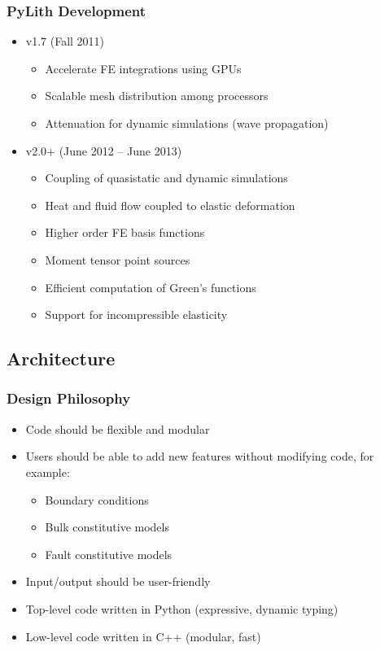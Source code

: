 \documentclass{beamer}
\begin{document}
\begin{frame}
  \frametitle{PyLith Development}

  \begin{itemize}
 \item v1.7 (Fall 2011)
    \begin{itemize}
    \item Accelerate FE integrations using GPUs
    \item Scalable mesh distribution among processors
    \item Attenuation for dynamic simulations (wave propagation)
    \end{itemize}
  \item v2.0+ (June 2012 -- June 2013)
    \begin{itemize}
    \item Coupling of quasistatic and dynamic simulations
    \item Heat and fluid flow coupled to elastic deformation
    \item Higher order FE basis functions
    \item Moment tensor point sources
    \item Efficient computation of Green's functions
    \item Support for incompressible elasticity
   \end{itemize}
  \end{itemize}

\end{frame}


\subsection{Architecture}

\begin{frame}
  \frametitle{Design Philosophy}

  \begin{itemize}
  \item Code should be flexible and modular
  \item Users should be able to add new features without modifying
    code, for example:
    \begin{itemize}
    \item Boundary conditions
    \item Bulk constitutive models
    \item Fault constitutive models
    \end{itemize}
  \item Input/output should be user-friendly
  \item Top-level code written in Python (expressive, dynamic typing)
  \item Low-level code written in C++ (modular, fast)
\end{itemize}

\end{frame}
\end{document}
